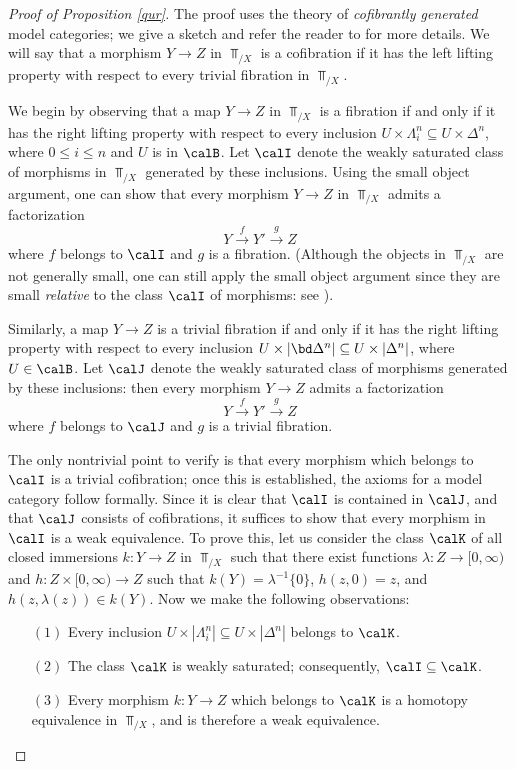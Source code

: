 \begin{proof}[Proof of Proposition \ref{qur}]
The proof uses the theory of {\em cofibrantly generated} model categories; we give a sketch and refer the reader to \cite{hirschhorn} for more details. We will say that a morphism $Y \rightarrow Z$ in $\Top_{/X}$ is a cofibration if it has the left lifting property with respect to every trivial fibration in $\Top_{/X}$. 

We begin by observing that a map $Y \rightarrow Z$ in $\Top_{/X}$ is a fibration if and only if it has the right lifting property with respect to every inclusion $U \times \Lambda^n_i \subseteq U \times \Delta^n$, where $0 \leq i \leq n$ and $U$ is in $\calB$. Let $\calI$ denote the weakly saturated class of morphisms in $\Top_{/X}$ generated by these inclusions. Using the small object argument, one can show that every morphism $Y \rightarrow Z$ in $\Top_{/X}$ admits a factorization
$$ Y \stackrel{f}{\rightarrow} Y' \stackrel{g}{\rightarrow} Z$$
where $f$ belongs to $\calI$ and $g$ is a fibration. (Although the objects in $\Top_{/X}$ are not generally small, one can still apply the small object argument since they are small {\it relative} to the class $\calI$ of morphisms: see \cite{hirschhorn}).

Similarly, a map $Y \rightarrow Z$ is a trivial fibration if and only if it has the right lifting property with respect to every inclusion $U \times |\bd \Delta^n| \subseteq U \times |\Delta^n|$, where $U \in \calB$. 
Let $\calJ$ denote the weakly saturated class of morphisms generated by these inclusions: then every
morphism $Y \rightarrow Z$ admits a factorization 
$$ Y \stackrel{f}{\rightarrow} Y' \stackrel{g}{\rightarrow} Z$$
where $f$ belongs to $\calJ$ and $g$ is a trivial fibration.

The only nontrivial point to verify is that every morphism which belongs to $\calI$ is a trivial cofibration; once this is established, the axioms for a model category follow formally. Since it is clear that $\calI$ is contained in $\calJ$, and that $\calJ$ consists of cofibrations, it suffices to show that every morphism in $\calI$ is a weak equivalence. To prove this, let us consider the class $\calK$ of all closed immersions $k: Y \rightarrow Z$ in $\Top_{/X}$ such that there exist functions $\lambda: Z \rightarrow [0, \infty)$ and $h: Z \times [0, \infty) \rightarrow Z$ such that $k(Y) = \lambda^{-1} \{0\}$, $h(z,0)=z$, and $h(z, \lambda(z)) \in k(Y)$. Now we make the following observations:
\begin{itemize}
\item[$(1)$] Every inclusion $U \times |\Lambda^n_i| \subseteq U \times |\Delta^n|$ belongs to $\calK$.
\item[$(2)$] The class $\calK$ is weakly saturated; consequently, $\calI \subseteq \calK$.
\item[$(3)$] Every morphism $k: Y \rightarrow Z$ which belongs to $\calK$ is a homotopy equivalence in $\Top_{/X}$, and is therefore a weak equivalence.
\end{itemize}
\end{proof}


